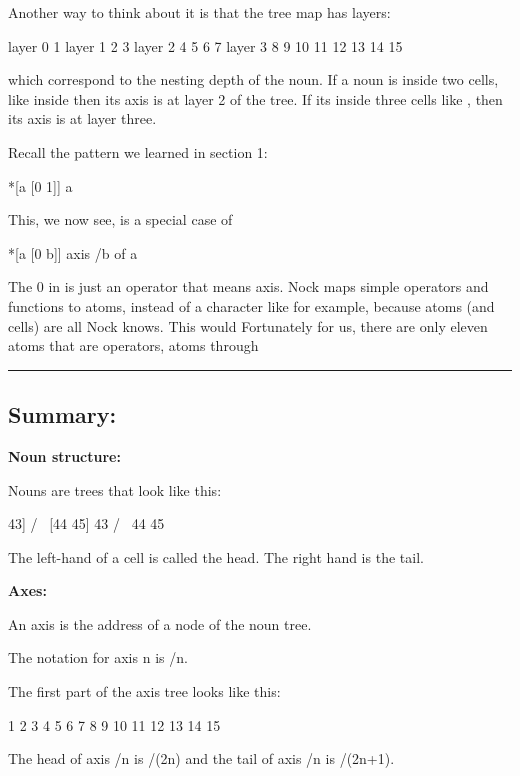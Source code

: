 Another way to think about it is that the tree map has layers:
\begin{code}
layer 0             1
layer 1        2          3
layer 2     4    5     6     7
layer 3    8 9 10 11 12 13 14 15
\end{code}
which correspond to the nesting depth of the noun. If a noun is inside two
cells, like  inside \kode{[[[48 49] 45] [46 47]]} then its axis is at layer 2 of
the tree. If its inside three cells like , then its axis is at layer
three.

Recall the pattern we learned in section 1:
\begin{code}
*[a [0 1]]                  a
\end{code}
This, we now see, is a special case of 
\begin{code}
*[a [0 b]]              axis /b of a
\end{code}
The 0 in \kode{*[a [0 b]]} is just an operator that means axis. Nock maps simple
operators and functions to atoms, instead of a character like \kode{/} for example,
because atoms (and cells) are all Nock knows. This would Fortunately for us,
there are only eleven atoms that are operators, atoms  through 

\begin{center}
\rule{3in}{0.4pt}
\end{center}

\subsection{Summary:}

\textbf{Noun structure:}

Nouns are trees that look like this:
\begin{code}
 [[44 45] 43]
    /      \
[44 45]    43
 /   \
44   45
\end{code}
The left-hand of a cell is called the head. The right hand is the tail.

\textbf{Axes:}

An axis is the address of a node of the noun tree.

The notation for axis n is /n.

The first part of the axis tree looks like this:
\begin{code}
         1
    2          3
 4    5     6     7
8 9 10 11 12 13 14 15
\end{code}
The head of axis /n is /(2n) and the tail of axis /n is /(2n+1). 

